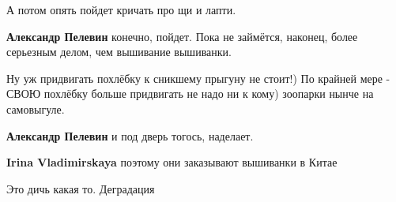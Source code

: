 \begin{itemize}
 

А потом опять пойдет кричать про щи и лапти.

\begin{itemize}

 
\textbf{Александр Пелевин} конечно, пойдет. Пока не займётся, наконец, более серьезным делом, чем вышивание вышиванки.

 
Ну уж придвигать похлёбку к сникшему прыгуну не стоит!) По крайней мере - СВОЮ
похлёбку больше придвигать не надо ни к кому) зоопарки нынче на самовыгуле.

 
\textbf{Александр Пелевин} и под дверь тогось, наделает.

 
\textbf{Irina Vladimirskaya} поэтому они заказывают вышиванки в Китае

 
Это дичь какая то. Деградация

 

\end{itemize}
\end{itemize}
